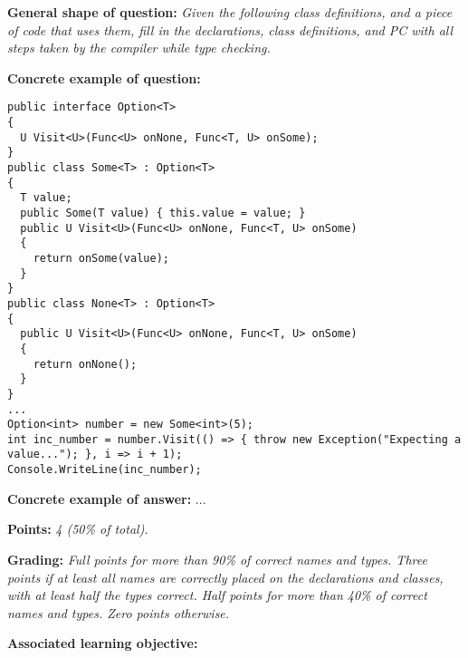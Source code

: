 \textbf{General shape of question:} \textit{Given the following class definitions, and a piece of code that uses them, fill in the declarations, class definitions, and PC with all steps taken by the compiler while type checking.}

\textbf{Concrete example of question:} 

\lstset{numbers=left,basicstyle=\ttfamily\small}\lstset{language=[Sharp]C}
\begin{lstlisting}
public interface Option<T>
{
  U Visit<U>(Func<U> onNone, Func<T, U> onSome);
}
public class Some<T> : Option<T>
{
  T value;
  public Some(T value) { this.value = value; }
  public U Visit<U>(Func<U> onNone, Func<T, U> onSome)
  {
    return onSome(value);
  }
}
public class None<T> : Option<T>
{
  public U Visit<U>(Func<U> onNone, Func<T, U> onSome)
  {
    return onNone();
  }
}
...
Option<int> number = new Some<int>(5);
int inc_number = number.Visit(() => { throw new Exception("Expecting a value..."); }, i => i + 1);
Console.WriteLine(inc_number);
\end{lstlisting}

\textbf{Concrete example of answer:} \textit{}
...

\textbf{Points:} \textit{4 (50\% of total).}

\textbf{Grading:} \textit{Full points for more than 90\% of correct names and types. Three points if at least all names are correctly placed on the declarations and classes, with at least half the types correct. Half points for more than 40\% of correct names and types. Zero points otherwise.}

\textbf{Associated learning objective:} 

\ \\
